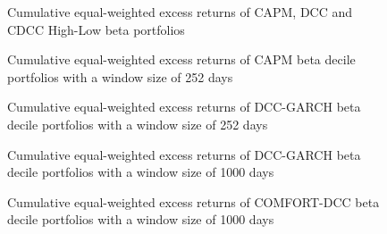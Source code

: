 \documentclass[11pt,a4paper]{article}
\begin{document}
\begin{figure}[H]
	\vspace{-12mm}
	\hspace{-5mm}\vspace{-15mm}
	\caption{Cumulative equal-weighted excess returns of CAPM, DCC and CDCC High-Low beta portfolios}
	\label{figure:eq_cum_ret_high-low_appendix}
\end{figure}

\begin{figure}[H]
	\vspace{-12mm}
	\hspace{-5mm}\vspace{-15mm}
	\caption{Cumulative equal-weighted excess returns of CAPM beta decile portfolios with a window size of 252 days}
	\label{figure:eq_cum_ret_deciles_CAPM_appendix}
\end{figure}

\begin{figure}[H]
	\vspace{-12mm}
	\hspace{-5mm}\vspace{-15mm}
	\caption{Cumulative equal-weighted excess returns of DCC-GARCH beta decile portfolios with a window size of 252 days}
	\label{figure:eq_cum_ret_deciles_DCC_appendix}
\end{figure}

\begin{figure}[H]
	\vspace{-12mm}
	\hspace{-5mm}\vspace{-15mm}
	\caption{Cumulative equal-weighted excess returns of DCC-GARCH beta decile portfolios with a window size of 1000 days}
	\label{figure:eq_cum_ret_deciles_DCC-1000_appendix}
\end{figure}

\begin{figure}[H]
	\vspace{-12mm}
	\hspace{-5mm}\vspace{-15mm}
	\caption{Cumulative equal-weighted excess returns of COMFORT-DCC beta decile portfolios with a window size of 1000 days}
	\label{figure:eq_cum_ret_deciles_COMFORT-DCC_appendix}
\end{figure}
\end{document}
